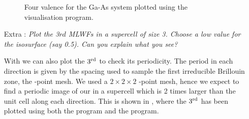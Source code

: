\begin{enumerate}
\begin{figure}[h!]
\centering
{}
\centering
{}
\centering
{}
\centering
{}
\caption{Four valence \MLWFs{} for the Ga-As system plotted using the \xcrysden{} visualisation program.}\label{fig1.2}
\end{figure}

\item[Extra :] {\it Plot the 3$rd$ MLWFs in a supercell of size 3. Choose a low value for the isosurface (say 0.5). Can
you explain what you see?}

With \xcrysden{} we can also plot the $3\tinysup{rd}$ \MLWF{} to check its periodicity. The period in each direction is given by the spacing used to sample the first irreducible Brillouin zone, \ie{} the \bfk-point mesh. We used a $2\times2\times2$ \bfk-point mesh, hence we expect to find a periodic image of our \MLWF{} in a supercell which is 2 times larger than the unit cell along each direction. This is shown in , where the $3\tinysup{rd}$ has been plotted using both the \xcrysden{} program and the \vesta{} program.   
\end{enumerate}

